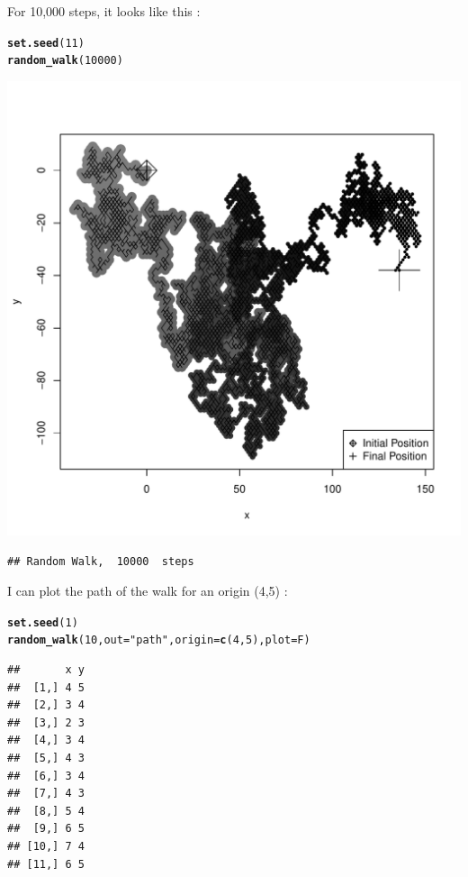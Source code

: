 \documentclass{llncs}\usepackage[]{graphicx}\usepackage[]{color}
\makeatletter
\def\maxwidth{ %
  \ifdim\Gin@nat@width>\linewidth
    \linewidth
  \else
    \Gin@nat@width
  \fi
}
\newcommand{\hlnum}[1]{\textcolor[rgb]{0.686,0.059,0.569}{#1}}%
\newcommand{\hlstr}[1]{\textcolor[rgb]{0.192,0.494,0.8}{#1}}%
\newcommand{\hlstd}[1]{\textcolor[rgb]{0.345,0.345,0.345}{#1}}%
\newcommand{\hlkwc}[1]{\textcolor[rgb]{0.333,0.667,0.333}{#1}}%
\newcommand{\hlkwd}[1]{\textcolor[rgb]{0.737,0.353,0.396}{\textbf{#1}}}%
\newenvironment{kframe}{%
 \def\at@end@of@kframe{}%
 \ifinner\ifhmode%
  \def\at@end@of@kframe{\end{minipage}}%
  \begin{minipage}{\columnwidth}%
 \fi\fi%
 \def\FrameCommand##1{\hskip\@totalleftmargin \hskip-\fboxsep
 \colorbox{shadecolor}{##1}\hskip-\fboxsep
     \hskip-\linewidth \hskip-\@totalleftmargin \hskip\columnwidth}%
 \MakeFramed {\advance\hsize-\width
   \@totalleftmargin\z@ \linewidth\hsize
   \@setminipage}}%
 {\par\unskip\endMakeFramed%
 \at@end@of@kframe}
\newenvironment{knitrout}{}{} %
\makeatother
\begin{document}
For 10,000 steps, it looks like this :
\begin{knitrout}
\color{fgcolor}\begin{kframe}
\begin{alltt}
\hlkwd{set.seed}\hlstd{(}\hlnum{11}\hlstd{)}
\hlkwd{random_walk}\hlstd{(}\hlnum{10000}\hlstd{)}
\end{alltt}
\end{kframe}
\includegraphics[width=\maxwidth]{figure/unnamed-chunk-20-1} 
\begin{kframe}\begin{lstlisting}[basicstyle=\ttfamily,breaklines=true]
## Random Walk,  10000  steps
\end{lstlisting}
\end{kframe}
\end{knitrout}
I can plot the path of the walk for an origin (4,5) :
\begin{knitrout}
\color{fgcolor}\begin{kframe}
\begin{alltt}
\hlkwd{set.seed}\hlstd{(}\hlnum{1}\hlstd{)}
\hlkwd{random_walk}\hlstd{(}\hlnum{10}\hlstd{,}\hlkwc{out}\hlstd{=}\hlstr{"path"}\hlstd{,}\hlkwc{origin}\hlstd{=}\hlkwd{c}\hlstd{(}\hlnum{4}\hlstd{,}\hlnum{5}\hlstd{),}\hlkwc{plot}\hlstd{=F)}
\end{alltt}
\begin{lstlisting}[basicstyle=\ttfamily,breaklines=true]
##       x y
##  [1,] 4 5
##  [2,] 3 4
##  [3,] 2 3
##  [4,] 3 4
##  [5,] 4 3
##  [6,] 3 4
##  [7,] 4 3
##  [8,] 5 4
##  [9,] 6 5
## [10,] 7 4
## [11,] 6 5
\end{lstlisting}
\end{kframe}
\end{knitrout}
\end{document}
